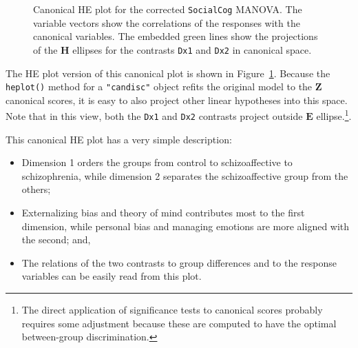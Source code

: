 \documentclass[
  letterpaper,
  10pt,
  krantz2]{krantz}
\providecommand{\tightlist}{%
  \setlength{\itemsep}{0pt}\setlength{\parskip}{0pt}}\usepackage{longtable,booktabs,array}
\begin{document}
\begin{figure}[H]


\caption{\label{fig-SC1-hecan}Canonical HE plot for the corrected
\texttt{SocialCog} MANOVA. The variable vectors show the correlations of
the responses with the canonical variables. The embedded green lines
show the projections of the \textbf{H} ellipses for the contrasts
\texttt{Dx1} and \texttt{Dx2} in canonical space.}

\end{figure}%

The HE plot version of this canonical plot is shown in
Figure~\ref{fig-SC1-hecan}. Because the \texttt{heplot()} method for a
\texttt{"candisc"} object refits the original model to the
\(\mathbf{Z}\) canonical scores, it is easy to also project other linear
hypotheses into this space. Note that in this view, both the
\texttt{Dx1} and \texttt{Dx2} contrasts project outside \(\mathbf{E}\)
ellipse.\footnote{The direct application of significance tests to
  canonical scores probably requires some adjustment because these are
  computed to have the optimal between-group discrimination.}.

This canonical HE plot has a very simple description:

\begin{itemize}
\tightlist
\item
  Dimension 1 orders the groups from control to schizoaffective to
  schizophrenia, while dimension 2 separates the schizoaffective group
  from the others;
\item
  Externalizing bias and theory of mind contributes most to the first
  dimension, while personal bias and managing emotions are more aligned
  with the second; and,
\item
  The relations of the two contrasts to group differences and to the
  response variables can be easily read from this plot.
\end{itemize}
\end{document}
